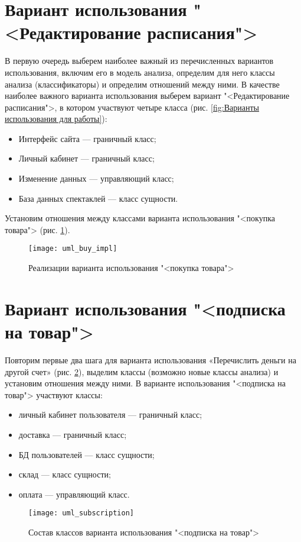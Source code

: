 \section{Вариант использования "<Редактирование расписания">}
В первую очередь выберем наиболее важный из перечисленных
вариантов использования, включим его в модель анализа, определим для него
классы анализа (классификаторы) и определим отношений между ними.
В качестве наиболее важного варианта использования выберем вариант
"<Редактирование расписания">, в котором участвуют четыре класса (рис. \ref{fig:Варианты использования для работы}):
\begin{itemize}
	\item Интерфейс сайта --- граничный класс;
	\item Личный кабинет --- граничный класс;
	\item Изменение данных --- управляющий класс;
	\item База данных спектаклей --- класс сущности.
\end{itemize}

Установим отношения между классами варианта использования
"<покупка товара"> (рис. \ref{fig:buy:impl}).
\begin{figure}[h!tp]
	\centering
	\texttt{[image: uml\_buy\_impl]}
	\caption{Реализации варианта использования "<покупка товара">}
	\label{fig:buy:impl}
\end{figure}

\section{Вариант использования "<подписка на товар">}
Повторим первые два шага для варианта использования
«Перечислить деньги на другой счет» (рис. \ref{fig:subscription}),
выделим классы (возможно новые классы анализа) и установим отношения
между ними. В варианте использования "<подписка на товар"> участвуют классы:
\begin{itemize}
	\item личный кабинет пользователя --- граничный класс;
	\item доставка --- граничный класс;
	\item БД пользователей --- класс сущности;
	\item склад --- класс сущности;
	\item оплата --- управляющий класс.
\end{itemize}
\begin{figure}[h!tp]
	\centering
	\texttt{[image: uml\_subscription]}
	\caption{Состав классов варианта использования "<подписка на товар">}
	\label{fig:subscription}
\end{figure}

